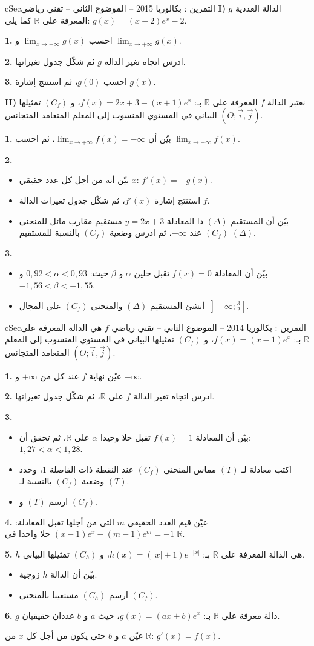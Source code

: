 \documentclass[12pt,a4paper]{article}
\newenvironment{BOX}[2]{\begin{otherlanguage}{english}\begin{arbox}{#1}{#2}}{\end{arbox}\end{otherlanguage}}
\newcounter{exo}
\newenvironment{tamrin}[1]{\stepcounter{exo}\begin{BOX}{cSec}{التمرين \theexo: #1}}{\end{BOX}}
\newcommand{\R}{\mathbb{R}}
\newenvironment{sq}{\begin{itemize}[leftmargin=2.4em,itemsep=3pt]}{\end{itemize}}
\newcommand{\qa}{\item[(أ)]}\newcommand{\qb}{\item[(ب)]}\newcommand{\qc}{\item[(جـ)]}\newcommand{\qd}{\item[(د)]}\newcommand{\qe}{\item[(هـ)]}
\newcommand{\QQ}[1]{\par\smallskip\textbf{#1.} }
\begin{document}
\begin{tamrin}{بكالوريا 2015 -- الموضوع الثاني -- تقني رياضي}
\textbf{I)} $g$ الدالة العددية المعرفة على $\R$ كما يلي: $g(x)=(x+2)e^{x}-2$.
\QQ{1} احسب $\displaystyle\lim_{x\to-\infty}g(x)$ و $\displaystyle\lim_{x\to+\infty}g(x)$.
\QQ{2} ادرس اتجاه تغير الدالة $g$ ثم شكّل جدول تغيراتها.
\QQ{3} احسب $g(0)$، ثم استنتج إشارة $g(x)$.

\textbf{II)} نعتبر الدالة $f$ المعرفة على $\R$ بـ: $f(x)=2x+3-(x+1)e^{x}$،
و $(C_f)$ تمثيلها البياني في المستوي المنسوب إلى المعلم المتعامد المتجانس $(O;\vec i,\vec j)$.
\QQ{1} بيّن أن $\displaystyle\lim_{x\to+\infty}f(x)=-\infty$، ثم احسب $\displaystyle\lim_{x\to-\infty}f(x)$.
\QQ{2}
\begin{sq}
\qa بيّن أنه من أجل كل عدد حقيقي $x$: $f'(x)=-g(x)$.
\qb استنتج إشارة $f'(x)$، ثم شكّل جدول تغيرات الدالة $f$.
\qc بيّن أن المستقيم $(\Delta)$ ذا المعادلة $y=2x+3$ مستقيم مقارب مائل للمنحنى $(C_f)$ عند $-\infty$، ثم ادرس وضعية $(C_f)$ بالنسبة للمستقيم $(\Delta)$.
\end{sq}
\QQ{3}
\begin{sq}
\qa بيّن أن المعادلة $f(x)=0$ تقبل حلين $\alpha$ و $\beta$ حيث: $0{,}92<\alpha<0{,}93$ و $-1{,}56<\beta<-1{,}55$.
\qb أنشئ المستقيم $(\Delta)$ والمنحنى $(C_f)$ على المجال $\left]{-}\infty;\frac32\right]$.
\end{sq}
\end{tamrin}

\begin{tamrin}{بكالوريا 2014 -- الموضوع الثاني -- تقني رياضي}
$f$ هي الدالة المعرفة على $\R$ بـ: $f(x)=(x-1)e^{x}$،
و $(C_f)$ تمثيلها البياني في المستوي المنسوب إلى المعلم المتعامد المتجانس $(O;\vec i,\vec j)$.
\QQ{1} عيّن نهاية $f$ عند كل من $+\infty$ و $-\infty$.
\QQ{2} ادرس اتجاه تغير الدالة $f$ على $\R$، ثم شكّل جدول تغيراتها.
\QQ{3}
\begin{sq}
\qa بيّن أن المعادلة $f(x)=1$ تقبل حلا وحيدا $\alpha$ على $\R$، ثم تحقق أن: $1{,}27<\alpha<1{,}28$.
\qb اكتب معادلة لـ $(T)$ مماس المنحنى $(C_f)$ عند النقطة ذات الفاصلة $1$، وحدد وضعية $(C_f)$ بالنسبة لـ $(T)$.
\qc ارسم $(T)$ و $(C_f)$.
\end{sq}
\QQ{4} عيّن قيم العدد الحقيقي $m$ التي من أجلها تقبل المعادلة: $(x-1)e^{x}-(m-1)e^{m}=-1$ حلا واحدا في $\R$.
\QQ{5} $h$ هي الدالة المعرفة على $\R$ بـ: $h(x)=\left(|x|+1\right)e^{-|x|}$، و $(C_h)$ تمثيلها البياني.
\begin{sq}
\qa بيّن أن الدالة $h$ زوجية.
\qb ارسم $(C_h)$ مستعينا بالمنحنى $(C_f)$.
\end{sq}
\QQ{6} $g$ دالة معرفة على $\R$ بـ: $g(x)=(ax+b)e^{x}$، حيث $a$ و $b$ عددان حقيقيان.
\par عيّن $a$ و $b$ حتى يكون من أجل كل $x$ من $\R$: $g'(x)=f(x)$.
\end{tamrin}
\end{document}
